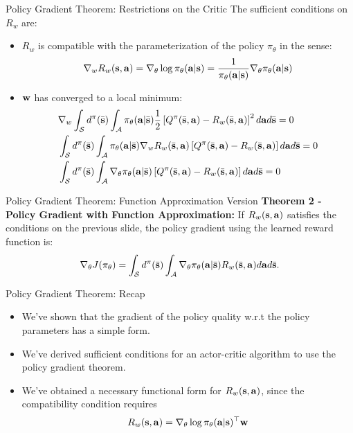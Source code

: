 \documentclass[]{beamer}
\begin{document}
\begin{frame}{Policy Gradient Theorem: Restrictions on the Critic}
    The sufficient conditions on $R_w$ are:
    \begin{itemize}
    \item $R_w$ is compatible with the parameterization of the policy $\pi_\theta$ in the sense:
        \begin{align*}
        \nabla_w R_w(\vs, \va) = \nabla_\theta \log \pi_\theta(\va | \vs) = \frac{1}{\pi_\theta(\va | \vs)}\nabla_\theta \pi_\theta(\va | \vs)
        \end{align*}
    \item $\vw$ has converged to a local minimum:
    \begin{align*}
        &\nabla_w \int_\cS d^\pi(\bar \vs) \int_\cA \pi_\theta(\va | \bar \vs)\frac{1}{2} \left[Q^\pi(\bar \vs, \va) - R_w(\bar \vs, \va) \right]^2 d\va d\bar \vs = 0 \\
        &\int_\cS d^\pi(\bar \vs) \int_\cA \pi_\theta(\va | \bar \vs) \nabla_w R_w(\bar \vs, \va) \left[Q^\pi(\bar \vs, \va) - R_w(\bar \vs, \va) \right] d\va d\bar \vs = 0\\
        &\int_\cS d^\pi(\bar \vs) \int_\cA \nabla_\theta \pi_\theta(\va | \bar \vs)\left[Q^\pi(\bar \vs, \va) - R_w(\bar \vs, \va) \right] d\va d\bar \vs = 0
    \end{align*}
    \end{itemize}
\end{frame}

\begin{frame}{Policy Gradient Theorem: Function Approximation Version}
    \textbf{Theorem 2 - Policy Gradient with Function Approximation:} \cite{sutton2000policy} If $R_w(\vs, \va)$ satisfies the conditions on the previous slide, the policy gradient using the learned reward function is:
    \[ \nabla_\theta J(\pi_\theta) = \int_\cS d^\pi(\bar \vs) \int_\cA \nabla_\theta \pi_\theta(\va | \bar \vs) R_w(\bar \vs, \va) d\va d\bar \vs. \]
\end{frame}

\begin{frame}{Policy Gradient Theorem: Recap}
    \begin{itemize}
        \item We've shown that the gradient of the policy quality w.r.t the policy parameters has a simple form.
        \item We've derived sufficient conditions for an actor-critic algorithm to use the policy gradient theorem.
        \item We've obtained a necessary functional form for $R_w(\vs, \va)$, since the compatibility condition requires
        \[ R_w(\vs, \va) = \nabla_\theta \log \pi_\theta(\va | \vs)^\top \vw \]
    \end{itemize}
\end{frame}
\end{document}
